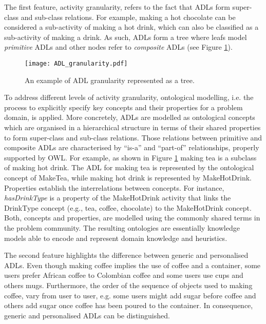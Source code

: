 The first feature, activity granularity, refers to the fact that ADLs form super-class and sub-class relations. For example, making a hot chocolate can be considered a sub-activity of making a hot drink, which can also be classified as a sub-activity of making a drink. As such, ADLs form a tree where leafs model \textit{primitive} ADLs and other nodes refer to \textit{composite} ADLs (see Figure \ref{fig-adl-granularity}).

\begin{figure}[htbp]%
\centering
\texttt{[image: ADL\_granularity.pdf]}
    \caption{An example of ADL granularity represented as a tree.} 
    \label{fig-adl-granularity}
\end{figure}

To address different levels of activity granularity, ontological modelling, i.e. the process to explicitly specify key concepts and their properties for a problem domain, is applied. More concretely, ADLs are modelled as ontological concepts which are organised in a hierarchical structure in terms of their shared properties to form super-class and sub-class relations. Those relations between primitive and composite ADLs are characterised by ``is-a'' and ``part-of'' relationships, properly supported by OWL. For example, as shown in Figure \ref{fig-adl-granularity} making tea is a subclass of making hot drink. The ADL for making tea is represented by the ontological concept of MakeTea, while making hot drink is represented by MakeHotDrink. Properties establish the interrelations between concepts. For instance, \textit{hasDrinkType} is a property of the MakeHotDrink activity that links the DrinkType concept (e.g., tea, coffee, chocolate) to the MakeHotDrink concept. Both, concepts and properties, are modelled using the commonly shared terms in the problem community. The resulting ontologies are essentially knowledge models able to encode and represent domain knowledge and heuristics. 

The second feature highlights the difference between generic and personalised ADLs. Even though making coffee implies the use of coffee and a container, some users prefer African coffee to Colombian coffee and some users use cups and others mugs. Furthermore, the order of the sequence of objects used to making coffee, vary from user to user, e.g. some users might add sugar before coffee and others add sugar once coffee has been poured to the container. In consequence, generic and personalised ADLs can be distinguished.

